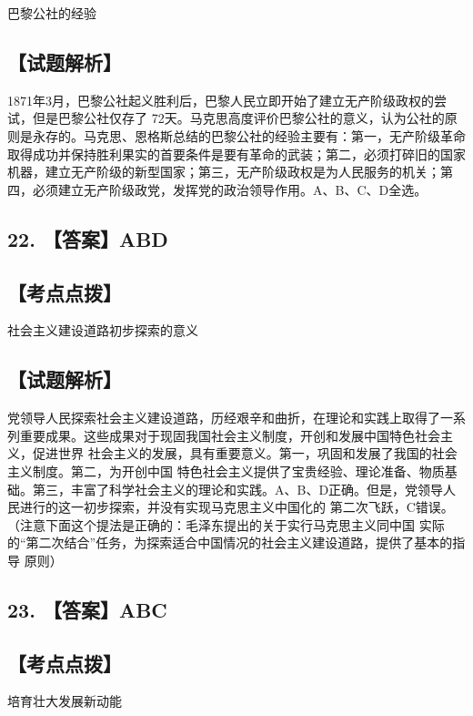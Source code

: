 \documentclass[UTF8,11pt]{ctexart}
\begin{document}
巴黎公社的经验


\subsection*{【试题解析】}

1871年3月，巴黎公社起义胜利后，巴黎人民立即开始了建立无产阶级政权的尝试，但是巴黎公社仅存了 72天。马克思高度评价巴黎公社的意义，认为公社的原则是永存的。马克思、恩格斯总结的巴黎公社的经验主要有：第一，无产阶级革命取得成功并保持胜利果实的首要条件是要有革命的武装；第二，必须打碎旧的国家机器，建立无产阶级的新型国家；第三，无产阶级政权是为人民服务的机关；第四，必须建立无产阶级政党，发挥党的政治领导作用。A、B、C、D全选。


\subsection*{22. 【答案】ABD}

\subsection*{【考点点拨】}

社会主义建设道路初步探索的意义


\subsection*{【试题解析】}

党领导人民探索社会主义建设道路，历经艰辛和曲折，在理论和实践上取得了一系 列重要成果。这些成果对于现固我国社会主义制度，开创和发展中国特色社会主义，促进世界 社会主义的发展，具有重要意义。第一，巩固和发展了我国的社会主义制度。第二，为开创中国 特色社会主义提供了宝贵经验、理论准备、物质基础。第三，丰富了科学社会主义的理论和实践。A、B、D正确。但是，党领导人民进行的这一初步探索，并没有实现马克思主义中国化的 第二次飞跃，C错误。（注意下面这个提法是正确的：毛泽东提出的关于实行马克思主义同中国 实际的“第二次结合”任务，为探索适合中国情况的社会主义建设道路，提供了基本的指导 原则）


\subsection*{23. 【答案】ABC}

\subsection*{【考点点拨】}

培育壮大发展新动能
\end{document}
